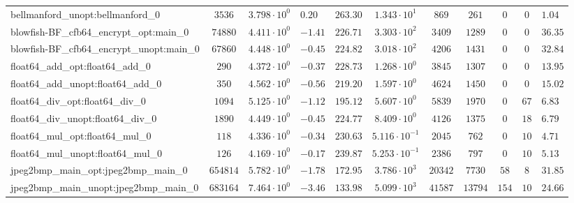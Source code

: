 \begin{tabular}{|l|c|HHc|c|c|c|c|cH|}
bellmanford\_unopt:bellmanford\_0               & $ 3536     $ & $ 3.798 \cdot 10^{0} $ & $ 0.20  $ & $ 263.30 $ & $ 1.343 \cdot 10^{1}  $ & $ 869    $ & $ 261   $ & $ 0   $ & $ 0   $ & $ 1.04    $ \\
blowfish-BF\_cfb64\_encrypt\_opt:main\_0        & $ 74880    $ & $ 4.411 \cdot 10^{0} $ & $ -1.41 $ & $ 226.71 $ & $ 3.303 \cdot 10^{2}  $ & $ 3409   $ & $ 1289  $ & $ 0   $ & $ 0   $ & $ 36.35   $ \\
blowfish-BF\_cfb64\_encrypt\_unopt:main\_0      & $ 67860    $ & $ 4.448 \cdot 10^{0} $ & $ -0.45 $ & $ 224.82 $ & $ 3.018 \cdot 10^{2}  $ & $ 4206   $ & $ 1431  $ & $ 0   $ & $ 0   $ & $ 32.84   $ \\
float64\_add\_opt:float64\_add\_0               & $ 290      $ & $ 4.372 \cdot 10^{0} $ & $ -0.37 $ & $ 228.73 $ & $ 1.268 \cdot 10^{0}  $ & $ 3845   $ & $ 1307  $ & $ 0   $ & $ 0   $ & $ 13.95   $ \\
float64\_add\_unopt:float64\_add\_0             & $ 350      $ & $ 4.562 \cdot 10^{0} $ & $ -0.56 $ & $ 219.20 $ & $ 1.597 \cdot 10^{0}  $ & $ 4624   $ & $ 1450  $ & $ 0   $ & $ 0   $ & $ 15.02   $ \\
float64\_div\_opt:float64\_div\_0               & $ 1094     $ & $ 5.125 \cdot 10^{0} $ & $ -1.12 $ & $ 195.12 $ & $ 5.607 \cdot 10^{0}  $ & $ 5839   $ & $ 1970  $ & $ 0   $ & $ 67  $ & $ 6.83    $ \\
float64\_div\_unopt:float64\_div\_0             & $ 1890     $ & $ 4.449 \cdot 10^{0} $ & $ -0.45 $ & $ 224.77 $ & $ 8.409 \cdot 10^{0}  $ & $ 4126   $ & $ 1375  $ & $ 0   $ & $ 18  $ & $ 6.79    $ \\
float64\_mul\_opt:float64\_mul\_0               & $ 118      $ & $ 4.336 \cdot 10^{0} $ & $ -0.34 $ & $ 230.63 $ & $ 5.116 \cdot 10^{-1} $ & $ 2045   $ & $ 762   $ & $ 0   $ & $ 10  $ & $ 4.71    $ \\
float64\_mul\_unopt:float64\_mul\_0             & $ 126      $ & $ 4.169 \cdot 10^{0} $ & $ -0.17 $ & $ 239.87 $ & $ 5.253 \cdot 10^{-1} $ & $ 2386   $ & $ 797   $ & $ 0   $ & $ 10  $ & $ 5.13    $ \\
jpeg2bmp\_main\_opt:jpeg2bmp\_main\_0           & $ 654814   $ & $ 5.782 \cdot 10^{0} $ & $ -1.78 $ & $ 172.95 $ & $ 3.786 \cdot 10^{3}  $ & $ 20342  $ & $ 7730  $ & $ 58  $ & $ 8   $ & $ 31.85   $ \\
jpeg2bmp\_main\_unopt:jpeg2bmp\_main\_0         & $ 683164   $ & $ 7.464 \cdot 10^{0} $ & $ -3.46 $ & $ 133.98 $ & $ 5.099 \cdot 10^{3}  $ & $ 41587  $ & $ 13794 $ & $ 154 $ & $ 10  $ & $ 24.66   $ \\

\end{tabular}
